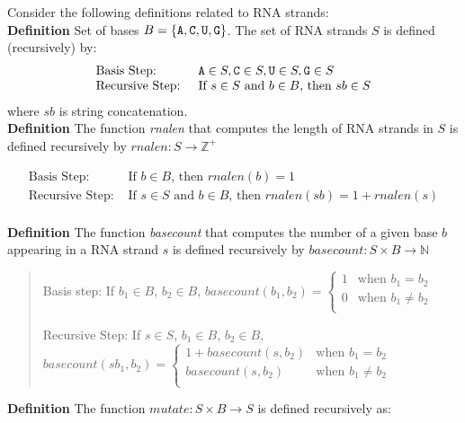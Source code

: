 \documentclass[12pt, oneside]{article}
\begin{document}
Consider the following definitions related to RNA strands:\\

{\bf Definition} Set of bases $B  =  \{ \texttt{A}, \texttt{C}, \texttt{U}, \texttt{G} \}$. The set of RNA strands $S$ is defined (recursively) by:
\[
\begin{array}{ll}
\textrm{Basis Step: } & \texttt{A} \in S, \texttt{C} \in S, \texttt{U} \in S, \texttt{G} \in S \\
\textrm{Recursive Step: } & \textrm{If } s \in S\textrm{ and }b \in B \textrm{, then }sb \in S
\end{array}
\]
where $sb$ is string concatenation. \\

{\bf Definition} The function \textit{rnalen} that computes the length of RNA strands in $S$ is defined recursively by
$rnalen: S  \to \mathbb{Z}^+$

\[
\begin{array}{ll}
\textrm{Basis Step: } &  \textrm{If } b \in B \textrm{, then } rnalen(b)  = 1\\

\textrm{Recursive Step: } & \textrm{If } s \in S \textrm{ and } b \in B \textrm{, then } rnalen(sb)  = 1 + rnalen(s)\\
\end{array}
\]

{\bf Definition} The function \textit{basecount} that computes the number of a given base $b$ appearing in a RNA strand $s$ is defined recursively by $basecount : S \times B \to\mathbb{N}$

\begin{quote}
Basis step: If  $b_1 \in B$, $b_2 \in B$, $basecount(b_1, b_2) =
        \begin{cases}
            1 & \textrm{when } b_1 = b_2 \\
            0 & \textrm{when } b_1 \neq b_2 \\
        \end{cases}$

Recursive Step: If $s \in S$, $b_1 \in B$, $b_2 \in B$, $basecount(s b_1, b_2) =
        \begin{cases}
            1 + \textit{basecount}(s, b_2) & \textrm{when } b_1 = b_2 \\
            \textit{basecount}(s, b_2) & \textrm{when } b_1 \neq b_2 \\
        \end{cases}$
\end{quote}

{\bf Definition} The function $\textit{mutate} :  S \times B \to S$ is defined recursively as:
\end{document}
